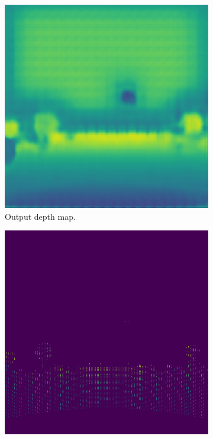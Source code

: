 \documentclass[twoside]{ctuthesis}
\theoremstyle{plain}
\theoremstyle{definition}
\theoremstyle{note}
\begin{document}
\begin{figure}
\begin{subfigure}[b]{0.4\textwidth}
		\includegraphics[width=\textwidth]{s2d_output.png}
		\caption{Output depth map.}
	\end{subfigure}
	\hfill
	\begin{subfigure}[b]{0.4\textwidth}
		\centering
		\includegraphics[width=\textwidth]{s2d_all.png}

\end{subfigure}
\end{figure}
\end{document}
